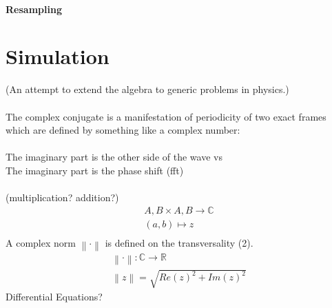\documentclass{report}
\newcommand\norm[1]{\left\lVert#1\right\rVert}
\begin{document}
\subsubsection{Resampling}

\chapter{Simulation}
(An attempt to extend the algebra to generic problems in physics.)\\\\
The complex conjugate is a manifestation of periodicity of two exact frames which are defined by something like a complex number:\\\\
The imaginary part is the other side of the wave vs\\
The imaginary part is the phase shift (fft)\\\\
(multiplication? addition?)
\begin{align}
A,B \times A,B \rightarrow \mathbb{C}\\
(a,b) \mapsto z\\
\end{align}
A complex norm $\norm{\cdot}$ is defined on the transversality (2).
\begin{align}
\norm{\cdot} : \mathbb{C} \rightarrow \mathbb{R}\\
\norm{z} = \sqrt{Re(z)^2+Im(z)^2}
\end{align}
Differential Equations?
\end{document}
